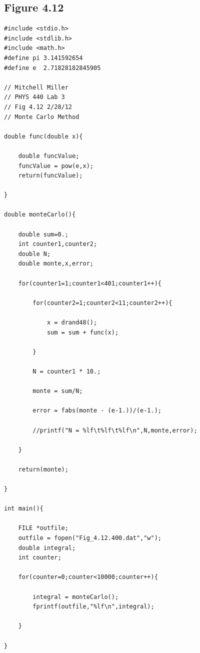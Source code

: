 \documentclass[12pt]{article}
\begin{document}
\subsection{Figure 4.12}
\begin{verbatim}
#include <stdio.h>
#include <stdlib.h>
#include <math.h>
#define pi 3.141592654
#define e  2.71828182845905

// Mitchell Miller
// PHYS 440 Lab 3
// Fig 4.12 2/28/12
// Monte Carlo Method

double func(double x){

	double funcValue;
	funcValue = pow(e,x);
	return(funcValue);

}

double monteCarlo(){

	double sum=0.;
	int counter1,counter2;
	double N;
	double monte,x,error;

	for(counter1=1;counter1<401;counter1++){

		for(counter2=1;counter2<11;counter2++){

			x = drand48();
			sum = sum + func(x);

		}

		N = counter1 * 10.;

		monte = sum/N;

		error = fabs(monte - (e-1.))/(e-1.);

		//printf("N = %lf\t%lf\t%lf\n",N,monte,error);

	}

	return(monte);

}	

int main(){

	FILE *outfile;
	outfile = fopen("Fig_4.12.400.dat","w");
	double integral;
	int counter;
	
	for(counter=0;counter<10000;counter++){
	
		integral = monteCarlo();
		fprintf(outfile,"%lf\n",integral);
		
	}

}	
\end{verbatim}
\end{document}
